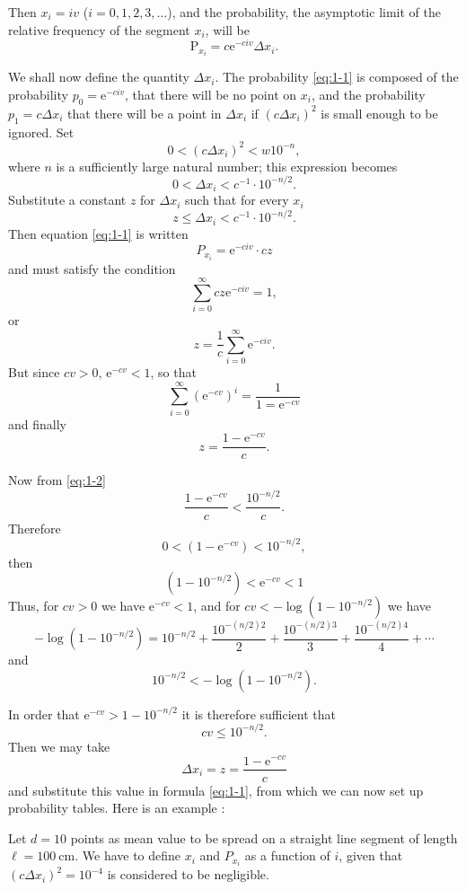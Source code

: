 \documentclass[letterpaper, 11pt]{article}
\begin{document}
Then \( x_i = iv \) (\( i = 0, 1, 2, 3, \dots \)), and the probability, the asymptotic limit of the
relative frequency of the segment \( x_i \), will be
\[
    \mathrm{P}_{x_i} = c \mathrm{e}^{-civ} \Delta x_i .
    \tag{1}
    \label{eq:1-1}
\]

We shall now define the quantity \( \Delta x_i \). The probability \eqref{eq:1-1} is composed of the
probability \( p_0 = \mathrm{e}^{-civ} \), that there will be no point on \( x_i \), and the
probability \( p_1 = c \Delta x_i \) that there will be a point in \( \Delta x_i \) if \( ( c \Delta
x_i )^2 \) is small enough to be ignored. Set
\[ 0 < (c \Delta x_i)^2 < w 10^{-n}, \] where \( n \) is a sufficiently large natural number; this
expression becomes
\[ 0 < \Delta x_i < c^{-1} \cdot 10^{-n/2} . \] Substitute a constant \( z \) for \( \Delta x_i \)
such that for every \( x_i \)
\[
    z \leq \Delta x_i < c^{-1} \cdot 10^{-n/2} .
    \tag{2}
    \label{eq:1-2}
\]
Then equation \eqref{eq:1-1} is written
\[
    P_{x_i} = \mathrm{e}^{-civ} \cdot cz
    \tag{3}
    \label{eq:1-3}
\]
and must satisfy the condition
\[ \sum_{i=0}^\infty cz \mathrm{e}^{-civ} = 1 ,\] or
\[ z = \frac{1}{c} \sum_{i=0}^\infty \mathrm{e}^{-civ} .\] But since \( cv > 0 \), \(
\mathrm{e}^{-cv} < 1 \), so that
\[ \sum_{i=0}^\infty \left( \mathrm{e}^{-cv} \right)^i =\frac{1}{1 = \mathrm{e}^{-cv}} \] and
finally
\[ z = \frac{1 - \mathrm{e}^{-cv}}{c} .\]

Now from \ref{eq:1-2}
\[ \frac{1 - \mathrm{e}^{-cv}}{c} < \frac{10^{-n/2}}{c} . \] Therefore
\[ 0 < \left( 1 - \mathrm{e}^{-cv} \right) < 10^{-n/2} , \] then
\[ \left( 1 - 10^{-n/2} \right) < \mathrm{e}^{-cv} < 1 \] Thus, for \( cv > 0 \) we have \(
\mathrm{e}^{-cv} < 1 \), and for \( cv < - \log{\left( 1 - 10^{-n/2} \right)} \) we have
\[ - \log{\left( 1 - 10^{-n/2} \right)} = 10^{-n/2} + \frac{10^{-(n/2)2}}{2} +
\frac{10^{-(n/2)3}}{3} +  \frac{10^{-(n/2)4}}{4} + \cdots \] and
\[ 10^{-n/2} < - \log{\left( 1 - 10^{-n/2}\right)} .\]

In order that \( \mathrm{e}^{-cv} > 1 - 10^{-n/2} \) it is therefore sufficient that
\[
    cv \leq 10^{-n/2}.
    \tag{4}
    \label{eq:1-4}
\]
Then we may take
\[
    \Delta x_i = z = \frac{1 - \mathrm{e}^{-cv}}{c}
    \tag{5}
    \label{eq:1-5}
\]
and substitute this value in formula \eqref{eq:1-1}, from which we can now set up probability
tables. Here is an example :

Let \( d = 10 \) points as mean value to be spread on a straight line segment of length \( \ell =
\qty{100}{\cm} \). We have to define \( x_i \) and \( P_{x_i} \) as a function of \( i \), given
that \( \left( c \Delta x_i \right)^2 = 10^{-4} \) is considered to be negligible.
\end{document}
